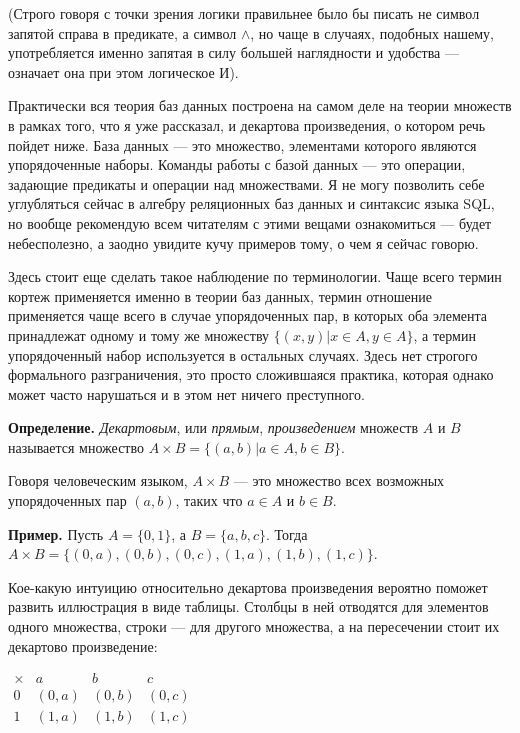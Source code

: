 (Строго говоря с точки зрения логики правильнее было бы писать не символ запятой справа в предикате, а символ $\wedge$, но чаще в случаях, подобных нашему, употребляется именно запятая в силу большей наглядности и удобства — означает она при этом логическое И).

Практически вся теория баз данных построена на самом деле на теории множеств в рамках того, что я уже рассказал, и декартова произведения, о котором речь пойдет ниже. База данных — это множество, элементами которого являются упорядоченные наборы. Команды работы с базой данных — это операции, задающие предикаты и операции над множествами. Я не могу позволить себе углубляться сейчас в алгебру реляционных баз данных и синтаксис языка SQL, но вообще рекомендую всем читателям с этими вещами ознакомиться — будет небесполезно, а заодно увидите кучу примеров тому, о чем я сейчас говорю.

Здесь стоит еще сделать такое наблюдение по терминологии. Чаще всего термин кортеж применяется именно в теории баз данных, термин отношение применяется чаще всего в случае упорядоченных пар, в которых оба элемента принадлежат одному и тому же множеству $\{(x, y)|x\in A, y\in A\}$, а термин упорядоченный набор используется в остальных случаях. Здесь нет строгого формального разграничения, это просто сложившаяся практика, которая однако может часто нарушаться и в этом нет ничего преступного.

{\bfseries Определение.} {\slshape Декартовым}, или {\slshape прямым}, {\slshape произведением} множеств $A$ и $B$ называется множество $A\times B = \{(a, b)|a\in A, b\in B\}$.

Говоря человеческим языком, $A\times B$ — это множество всех возможных упорядоченных пар $(a, b)$, таких что $a\in A$ и $b \in B$.

{\bfseries Пример.} Пусть $A = \{0, 1\}$, а $B = \{a, b, c\}$. Тогда $A\times B = \{(0, a), (0, b), (0, c), (1, a), (1, b), (1, c)\}$.

Кое-какую интуицию относительно декартова произведения вероятно поможет развить иллюстрация в виде таблицы. Столбцы в ней отводятся для элементов одного множества, строки — для другого множества, а на пересечении стоит их декартово произведение:

$\begin{array}{c|ccc}\times & a&b&c\\ \hline 0 & (0,a) & (0, b) & (0, c) \\ 1 & (1, a)& (1, b) &(1, c)\end{array}$

